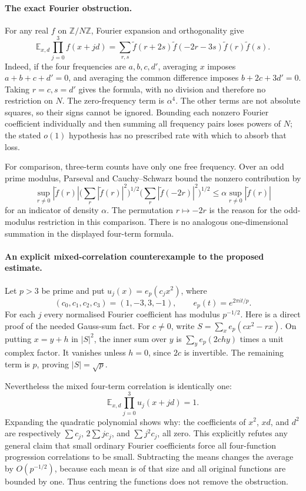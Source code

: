 \documentclass[11pt,a4paper]{article}
\newcommand{\Z}{\mathbb{Z}}
\newcommand{\E}{\mathbb{E}}
\begin{document}
\paragraph{The exact Fourier obstruction.}
For any real $f$ on $\Z/N\Z$, Fourier expansion and orthogonality give
\[
 \E_{x,d}\prod_{j=0}^3f(x+jd)
 =\sum_{r,s}\widetilde f(r+2s)\widetilde f(-2r-3s)
                 \widetilde f(r)\widetilde f(s).
\]
Indeed, if the four frequencies are $a,b,c,d'$, averaging $x$ imposes $a+b+c+d'=0$, and averaging the common difference imposes $b+2c+3d'=0$. Taking $r=c,s=d'$ gives the formula, with no division and therefore no restriction on $N$. The zero-frequency term is $\alpha^4$. The other terms are not absolute squares, so their signs cannot be ignored. Bounding each nonzero Fourier coefficient individually and then summing all frequency pairs loses powers of $N$; the stated $o(1)$ hypothesis has no prescribed rate with which to absorb that loss.

For comparison, three-term counts have only one free frequency. Over an odd prime modulus, Parseval and Cauchy--Schwarz bound the nonzero contribution by
\[
 \sup_{r\ne0}|\widetilde f(r)|
 \Big(\sum_r|\widetilde f(r)|^2\Big)^{1/2}
 \Big(\sum_r|\widetilde f(-2r)|^2\Big)^{1/2}
 \leq \alpha\sup_{r\ne0}|\widetilde f(r)|
\]
for an indicator of density $\alpha$. The permutation $r\mapsto-2r$ is the reason for the odd-modulus restriction in this comparison. There is no analogous one-dimensional summation in the displayed four-term formula.

\paragraph{An explicit mixed-correlation counterexample to the proposed estimate.}
Let $p>3$ be prime and put $u_j(x)=e_p(c_jx^2)$, where
\[
 (c_0,c_1,c_2,c_3)=(1,-3,3,-1),\qquad e_p(t)=e^{2\pi it/p}.
\]
For each $j$ every normalised Fourier coefficient has modulus $p^{-1/2}$. Here is a direct proof of the needed Gauss-sum fact. For $c\ne0$, write $S=\sum_x e_p(cx^2-rx)$. On putting $x=y+h$ in $|S|^2$, the inner sum over $y$ is $\sum_y e_p(2chy)$ times a unit complex factor. It vanishes unless $h=0$, since $2c$ is invertible. The remaining term is $p$, proving $|S|=\sqrt p$.

Nevertheless the mixed four-term correlation is identically one:
\[
 \E_{x,d}\prod_{j=0}^3u_j(x+jd)=1.
\]
Expanding the quadratic polynomial shows why: the coefficients of $x^2$, $xd$, and $d^2$ are respectively $\sum c_j$, $2\sum jc_j$, and $\sum j^2c_j$, all zero. This explicitly refutes any general claim that small ordinary Fourier coefficients force all four-function progression correlations to be small. Subtracting the means changes the average by $O(p^{-1/2})$, because each mean is of that size and all original functions are bounded by one. Thus centring the functions does not remove the obstruction.
\end{document}
